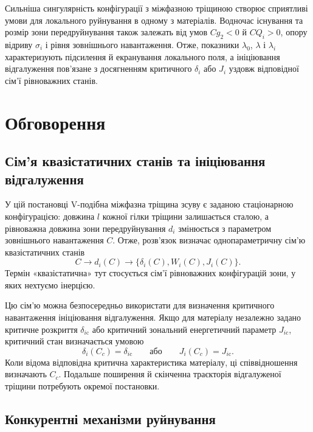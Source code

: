 Сильніша сингулярність конфігурації з міжфазною тріщиною створює сприятливі умови для локального руйнування в одному з матеріалів. Водночас існування та розмір зони передруйнування також залежать від умов $Cg_2<0$ й $CQ_i>0$, опору відриву $\sigma_i$ і рівня зовнішнього навантаження. Отже, показники $\lambda_0$, $\lambda$ і $\lambda_i$ характеризують підсилення й екранування локального поля, а ініціювання відгалуження пов’язане з досягненням критичного $\delta_i$ або $J_i$ уздовж відповідної сім’ї рівноважних станів.

\section{Обговорення}
\label{sec:discussion}

\subsection{Сім’я квазістатичних станів та ініціювання відгалуження}
\label{subsec:discussion-quasistatic}

У цій постановці V-подібна міжфазна тріщина зсуву є заданою стаціонарною конфігурацією: довжина $l$ кожної гілки тріщини залишається сталою, а рівноважна довжина зони передруйнування $d_i$ змінюється з параметром зовнішнього навантаження $C$. Отже, розв’язок визначає однопараметричну сім’ю квазістатичних станів
\begin{equation*}
  C\longrightarrow d_i(C)
  \longrightarrow
  \bigl\{\delta_i(C),W_i(C),J_i(C)\bigr\}.
\end{equation*}
Термін «квазістатична» тут стосується сім’ї рівноважних конфігурацій зони, у яких нехтуємо інерцією.

Цю сім’ю можна безпосередньо використати для визначення критичного навантаження ініціювання відгалуження. Якщо для матеріалу незалежно задано критичне розкриття $\delta_{i\mathrm{c}}$ або критичний зональний енергетичний параметр $J_{i\mathrm{c}}$, критичний стан визначається умовою
\begin{equation*}
  \delta_i(C_c)=\delta_{i\mathrm{c}}
  \qquad\text{або}\qquad
  J_i(C_c)=J_{i\mathrm{c}}.
\end{equation*}
Коли відома відповідна критична характеристика матеріалу, ці співвідношення визначають $C_c$. Подальше поширення й скінченна траєкторія відгалуженої тріщини потребують окремої постановки.

\subsection{Конкурентні механізми руйнування}
\label{subsec:discussion-competing}


